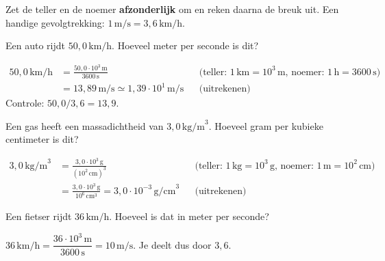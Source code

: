 \documentclass{ximera}
\begin{document}
\begin{proposition}[title={Omzetten van samengestelde eenheden}]\nl
    Zet de teller en de noemer \textbf{afzonderlijk} om en reken daarna de breuk uit. Een handige gevolgtrekking: $1 \, \mathrm{m/s} = 3{,}6 \, \mathrm{km/h}$.
\end{proposition}

\begin{example}[foldable=true,title={Voorbeeld: kilometer per uur naar meter per seconde}]\nl
    Een auto rijdt $50{,}0 \, \mathrm{km/h}$. Hoeveel meter per seconde is dit?

    \begin{solution}\nl
        \begin{align*}
            50{,}0 \, \mathrm{km/h} &= \frac{50{,}0 \cdot 10^{3} \, \mathrm{m}}{3600 \, \mathrm{s}} && \text{(teller: $1 \, \mathrm{km} = 10^{3} \, \mathrm{m}$, noemer: $1 \, \mathrm{h} = 3600 \, \mathrm{s}$)}\\
            &= 13{,}89 \, \mathrm{m/s} \simeq \boxed{1{,}39 \cdot 10^{1} \, \mathrm{m/s}} && \text{(uitrekenen)}
        \end{align*}
        Controle: $50{,}0 / 3{,}6 = 13{,}9$.
    \end{solution}
\end{example}

\begin{example}[foldable=true,title={Voorbeeld: kilogram per kubieke meter naar gram per kubieke centimeter}]\nl
    Een gas heeft een massadichtheid van $3{,}0 \, \mathrm{kg/m}^{3}$. Hoeveel gram per kubieke centimeter is dit?

    \begin{solution}\nl
        \begin{align*}
            3{,}0 \, \mathrm{kg/m}^{3} &= \frac{3{,}0 \cdot 10^{3} \, \mathrm{g}}{(10^{2} \, \mathrm{cm})^{3}} && \text{(teller: $1 \, \mathrm{kg} = 10^{3} \, \mathrm{g}$, noemer: $1 \, \mathrm{m} = 10^{2} \, \mathrm{cm}$)}\\
            &= \frac{3{,}0 \cdot 10^{3} \, \mathrm{g}}{10^{6} \, \mathrm{cm}^{3}} = \boxed{3{,}0 \cdot 10^{-3} \, \mathrm{g/cm}^{3}} && \text{(uitrekenen)}
        \end{align*}
    \end{solution}
\end{example}

\begin{question}
    Een fietser rijdt $36 \, \mathrm{km/h}$. Hoeveel is dat in meter per seconde?

    \begin{multipleChoice}
    \end{multipleChoice}

    \begin{solution}\nl
        $36 \, \mathrm{km/h} = \dfrac{36 \cdot 10^{3} \, \mathrm{m}}{3600 \, \mathrm{s}} = 10 \, \mathrm{m/s}$. Je deelt dus door $3{,}6$.
    \end{solution}
\end{question}
\end{document}
